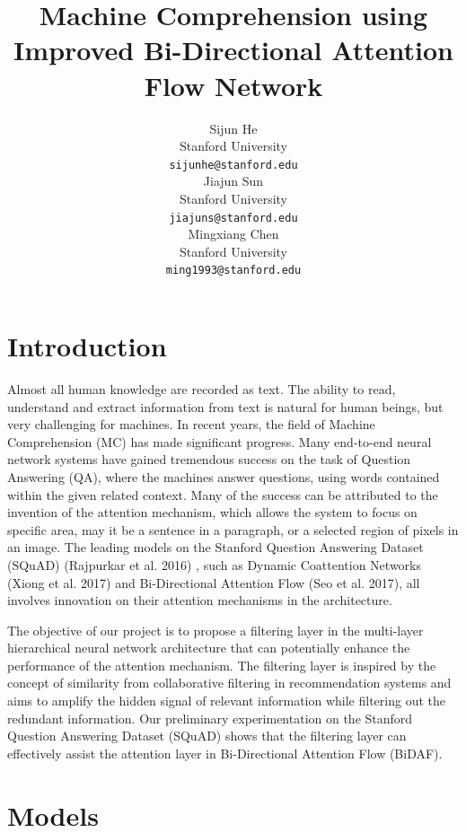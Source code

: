 \documentclass{article} %
\title{Machine Comprehension using Improved Bi-Directional Attention Flow Network}
\author{
Sijun He \\
Stanford University \\
\texttt{sijunhe@stanford.edu} \\
\And
Jiajun Sun \\
Stanford University \\
\texttt{jiajuns@stanford.edu} \\
\And
Mingxiang Chen \\
Stanford University \\
\texttt{ming1993@stanford.edu} \\
}
\begin{document}
\maketitle

\begin{abstract}

\end{abstract}

\section{Introduction}
\label{introduction}

Almost all human knowledge are recorded as text. The ability to read, understand and extract information from text is natural for human beings, but very challenging for machines. In recent years, the field of Machine Comprehension (MC) has made significant progress. Many end-to-end neural network systems have gained tremendous success on the task of Question Answering (QA), where the machines answer questions, using words contained within the given related context. Many of the success can be attributed to the invention of the attention mechanism, which allows the system to focus on specific area, may it be a sentence in a paragraph, or a selected region of pixels in an image. The leading models on the Stanford Question Answering Dataset (SQuAD) (Rajpurkar et al. 2016) , such as Dynamic Coattention Networks (Xiong et al. 2017) and Bi-Directional Attention Flow (Seo et al. 2017), all involves innovation on their attention mechanisms in the architecture. 

The objective of our project is to propose a filtering layer in the multi-layer hierarchical neural network architecture that can potentially enhance the performance of the attention mechanism. The filtering layer is inspired by the concept of similarity from collaborative filtering in recommendation systems and aims to amplify the hidden signal of relevant information while filtering out the redundant information. Our preliminary experimentation on the Stanford Question Answering Dataset (SQuAD) shows that the filtering layer can effectively assist the attention layer in Bi-Directional Attention Flow (BiDAF).
\section{Models}
\label{models}
\end{document}
